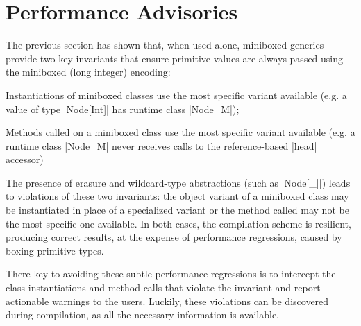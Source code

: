 \section{Performance Advisories}
\label{sec:advisories}

The previous section has shown that, when used alone, miniboxed generics provide two key invariants that ensure primitive values are always passed using the miniboxed (long integer) encoding:

\begin{compactitem}
\item Instantiations of miniboxed classes use the most specific variant available (e.g. a value of type |Node[Int]| has runtime class |Node_M|);
\item Methods called on a miniboxed class use the most specific variant available (e.g. a runtime class |Node_M| never receives calls to the reference-based |head| accessor)
\end{compactitem}

The presence of erasure and wildcard-type abstractions (such as |Node[_]|) leads to violations of these two invariants: the object variant of a miniboxed class may be instantiated in place of a specialized variant or the method called may not be the most specific one available. In both cases, the compilation scheme is resilient, producing correct results, at the expense of performance regressions, caused by boxing primitive types.

There key to avoiding these subtle performance regressions is to intercept the class instantiations and method calls that violate the invariant and report actionable warnings to the users. Luckily, these violations can be discovered during compilation, as all the necessary information is available.



